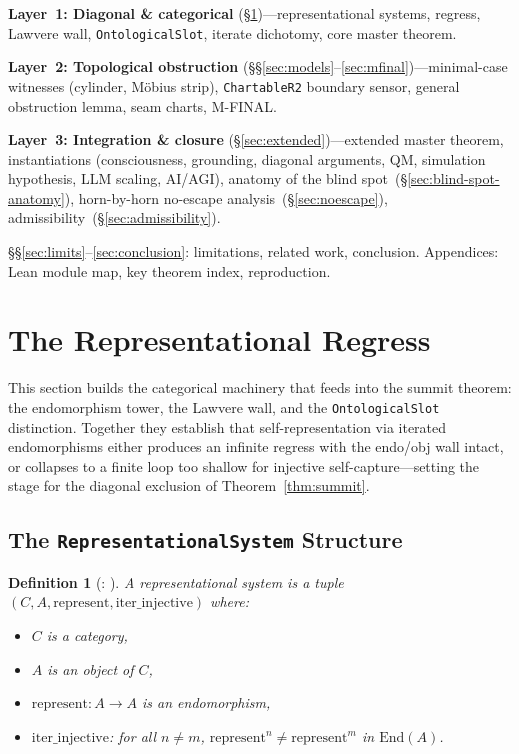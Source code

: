 \documentclass[11pt]{article}
\newtheorem{definition}[theorem]{Definition}
\begin{document}
\textbf{Layer~1: Diagonal \& categorical}
(\S\ref{sec:regress})---representational systems, regress, Lawvere wall,
\texttt{OntologicalSlot}, iterate dichotomy, core master theorem.

\textbf{Layer~2: Topological obstruction}
(\S\S\ref{sec:models}--\ref{sec:mfinal})---minimal-case witnesses
(cylinder, M\"obius strip), \texttt{ChartableR2} boundary sensor, general
obstruction lemma, seam charts, M-FINAL.

\textbf{Layer~3: Integration \& closure}
(\S\ref{sec:extended})---extended master theorem, instantiations
(consciousness, grounding, diagonal arguments, QM, simulation
hypothesis, LLM scaling, AI/AGI), anatomy of the blind
spot~(\S\ref{sec:blind-spot-anatomy}),
horn-by-horn no-escape analysis~(\S\ref{sec:noescape}),
admissibility~(\S\ref{sec:admissibility}).

\S\S\ref{sec:limits}--\ref{sec:conclusion}: limitations, related work,
conclusion.  Appendices: Lean module map, key theorem index, reproduction.

\section{The Representational Regress}
\label{sec:regress}

This section builds the categorical machinery that feeds into the summit
theorem: the endomorphism tower, the Lawvere wall, and the
\texttt{OntologicalSlot} distinction.  Together they establish that
self-representation via iterated endomorphisms either produces an
infinite regress with the endo/obj wall intact, or collapses to a finite
loop too shallow for injective self-capture---setting the stage for the
diagonal exclusion of Theorem~\ref{thm:summit}.

\subsection{The \texttt{RepresentationalSystem} Structure}
\label{sec:repsys}

\begin{definition}[: ]
\leavevmode\par\noindent
A \emph{representational system} is a tuple $(C, A, \mathrm{represent}, \mathrm{iter\_injective})$ where:
\begin{itemize}
\item $C$ is a category,
\item $A$ is an object of $C$,
\item $\mathrm{represent} : A \to A$ is an endomorphism,
\item $\mathrm{iter\_injective}$: for all $n \neq m$, $\mathrm{represent}^n \neq \mathrm{represent}^m$ in $\mathrm{End}(A)$.
\end{itemize}
\end{definition}
\end{document}
